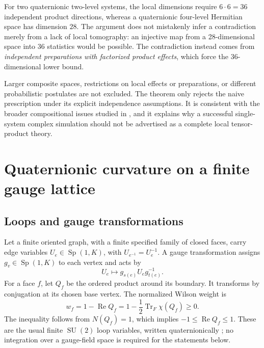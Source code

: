 \documentclass[11pt,oneside]{article}
\numberwithin{equation}{section}
\theoremstyle{plain}
\theoremstyle{definition}
\theoremstyle{remark}
\newcommand{\Tr}{\operatorname{Tr}}
\newcommand{\Rea}{\operatorname{Re}}
\newcommand{\SU}{\operatorname{SU}}
\newcommand{\Sp}{\operatorname{Sp}}
\begin{document}
For two quaternionic two-level systems, the local dimensions require $6\cdot6=36$ independent product directions, whereas a quaternionic four-level Hermitian space has dimension $28$. The argument does not mistakenly infer a contradiction merely from a lack of local tomography: an injective map from a 28-dimensional space into 36 statistics would be possible. The contradiction instead comes from \emph{independent preparations with factorized product effects}, which force the 36-dimensional lower bound.

Larger composite spaces, restrictions on local effects or preparations, or different probabilistic postulates are not excluded. The theorem only rejects the naive prescription under its explicit independence assumptions. It is consistent with the broader compositional issues studied in \cite{BarnumWilce}, and it explains why a successful single-system complex simulation should not be advertised as a complete local tensor-product theory.

\section{Quaternionic curvature on a finite gauge lattice}\label{sec:gauge}

\subsection{Loops and gauge transformations}
Let a finite oriented graph, with a finite specified family of closed faces, carry edge variables $U_e\in\Sp(1,K)$, with $U_{e^{-1}}=U_e^{-1}$. A gauge transformation assigns $g_v\in\Sp(1,K)$ to each vertex and acts by
\[
 U_e\longmapsto g_{s(e)}U_e g_{t(e)}^{-1}.
\]
For a face $f$, let $Q_f$ be the ordered product around its boundary. It transforms by conjugation at its chosen base vertex. The normalized Wilson weight is
\begin{equation}\label{eq:WilsonWeight}
 w_f=1-\Rea Q_f
 =1-\frac12\Tr_F\chi(Q_f)\ge0.
\end{equation}
The inequality follows from $N(Q_f)=1$, which implies $-1\le\Rea Q_f\le1$. These are the usual finite $\SU(2)$ loop variables, written quaternionically \cite{Wilson}; no integration over a gauge-field space is required for the statements below.
\end{document}
